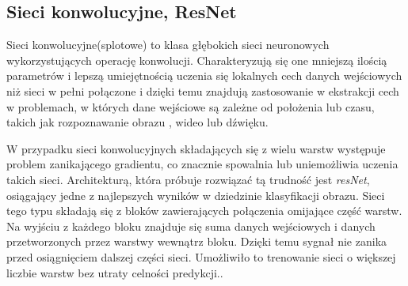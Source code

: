 \documentclass[a4paper,11pt,twoside]{report}
\theoremstyle{definition}
\begin{document}
\subsection{Sieci konwolucyjne, ResNet}

Sieci konwolucyjne(splotowe) to klasa głębokich sieci neuronowych wykorzystujących operację konwolucji. Charakteryzują się one mniejszą ilością parametrów i lepszą umiejętnością uczenia się lokalnych cech danych wejściowych niż sieci w pełni połączone\cite{cnn} i dzięki temu znajdują zastosowanie w ekstrakcji cech w problemach, w których dane wejściowe są zależne od położenia lub czasu, takich jak rozpoznawanie obrazu \cite{vgg}, wideo\cite{cnnVideo} lub dźwięku\cite{cnnAudio}. 

W przypadku sieci konwolucyjnych składających się z wielu warstw występuje problem zanikającego gradientu, co znacznie spowalnia lub uniemożliwia uczenia takich sieci\cite{difficulty}.
Architekturą, która próbuje rozwiązać tą trudność jest \textit{resNet}, osiągający jedne z najlepszych wyników w dziedzinie klasyfikacji obrazu. Sieci tego typu składają się z bloków zawierających połączenia omijające część warstw. Na wyjściu z każdego bloku znajduje się suma danych wejściowych i danych przetworzonych przez warstwy wewnątrz bloku. Dzięki temu sygnał nie zanika przed osiągnięciem dalszej części sieci. Umożliwiło to trenowanie sieci o większej liczbie warstw bez utraty celności predykcji.\cite{resnet}.
\end{document}
